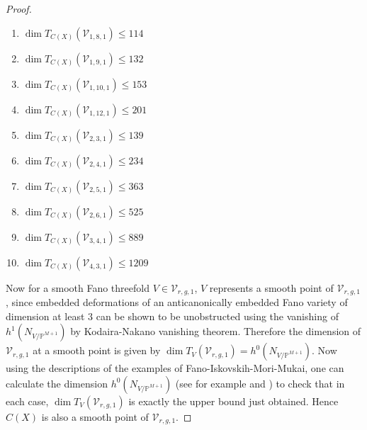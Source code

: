 \documentclass[11pt,twoside]{amsart}
\theoremstyle{plain}
\numberwithin{equation}{section}
\theoremstyle{definition}
\begin{document}
\begin{proof}
\begin{enumerate}
      \item $\operatorname{dim}T_{C(X)}(\mathcal{V}_{1,8,1}) \leq 114$

      \item $\operatorname{dim}T_{C(X)}(\mathcal{V}_{1,9,1}) \leq 132$
      
      \item $\operatorname{dim}T_{C(X)}(\mathcal{V}_{1,10,1}) \leq 153$

      \item $\operatorname{dim}T_{C(X)}(\mathcal{V}_{1,12,1}) \leq 201$
      
      \item $\operatorname{dim}T_{C(X)}(\mathcal{V}_{2,3,1}) \leq 139$

      \item $\operatorname{dim}T_{C(X)}(\mathcal{V}_{2,4,1}) \leq 234$

      \item $\operatorname{dim}T_{C(X)}(\mathcal{V}_{2,5,1}) \leq 363$

      \item $\operatorname{dim}T_{C(X)}(\mathcal{V}_{2,6,1}) \leq 525$

      \item $\operatorname{dim}T_{C(X)}(\mathcal{V}_{3,4,1}) \leq 889$

      \item $\operatorname{dim}T_{C(X)}(\mathcal{V}_{4,3,1}) \leq 1209$
  \end{enumerate}
Now for a smooth Fano threefold $V \in \mathcal{V}_{r,g,1}$, $V$ represents a smooth point of $\mathcal{V}_{r,g,1}$, since embedded deformations of an anticanonically embedded Fano variety of dimension at least $3$ can be shown to be unobstructed using the vanishing of $h^1(N_{V/\mathbb{P}^{M+1}})$ by Kodaira-Nakano vanishing theorem. Therefore the dimension of $\mathcal{V}_{r,g,1}$ at a smooth point is given by $\operatorname{dim}T_V(\mathcal{V}_{r,g,1}) = h^0(N_{V/\mathbb{P}^{M+1}})$. Now using the descriptions of the examples of Fano-Iskovskih-Mori-Mukai, one can calculate the dimension $h^0(N_{V/\mathbb{P}^{M+1}})$ (see for example \cite[Table $2$, pg $666$]{CLM93} and \cite[Table $3.1$]{CLM98}) to check that in each case, $\operatorname{dim}T_V(\mathcal{V}_{r,g,1})$ is exactly the upper bound just obtained. Hence $C(X)$ is also a smooth point of $\mathcal{V}_{r,g,1}$. 

  
\end{proof}


\vspace{0.5cm}
\end{document}
